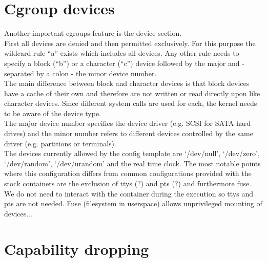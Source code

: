 \section{Cgroup devices}

Another important cgroups feature is the device section.\\
First all devices are denied and then permitted exclusively. For this purpose the wildcard rule ``a'' exists which includes
all devices. Any other rule needs to specify a block (``b'') or a character (``c'') device followed by the major and
- separated by a colon - the minor device number.\\
The main difference between block and character devices is that block devices have a cache of their own and therefore are not
written or read directly upon like character devices. Since different system calls are used for each, the kernel
needs to be aware of the device type.\\%
The major device number specifies the device driver (e.g. SCSI for SATA hard drives) and the minor number refers to different
devices controlled by the same driver (e.g. partitions or terminals)\cite{devicenumbers}.\\
The devices currently allowed by the config template are `/dev/null', `/dev/zero', `/dev/random', `/dev/urandom' and the real time clock.
The most notable points where this configuration differs from common configurations provided with the stock containers are
the exclusion of ttys (?) and pts (?) and furthermore fuse.
We do not need to interact with the container during the execution so ttys and pts are not needed.
Fuse (filesystem in userspace) allows unprivileged mounting of devices...


\section{Capability dropping}

